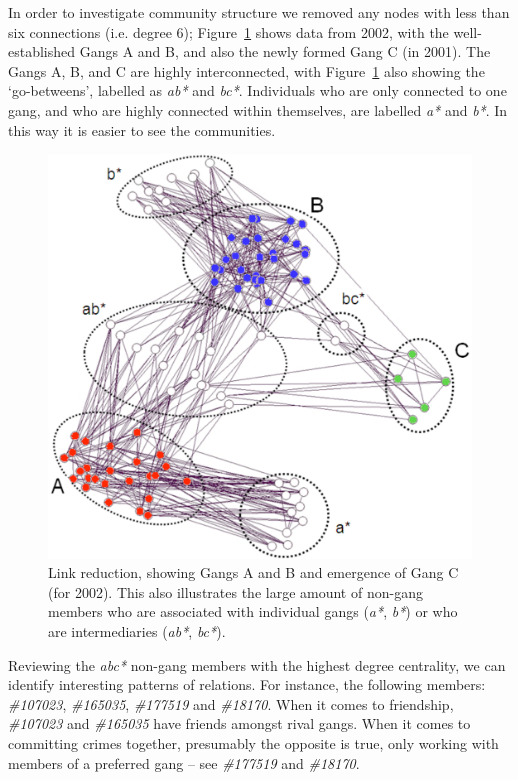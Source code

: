 \documentclass[twocolumn]{svjour3}          %
\theoremstyle{definition}
\begin{document}
In order to investigate community structure we removed any nodes with
less than six connections (i.e. degree 6);
Figure~\ref{fig:2002core_labelled} shows data from 2002, with the
well-established Gangs A and B, and also the newly formed Gang C (in
2001). The Gangs A, B, and C are highly interconnected, with
Figure~\ref{fig:2002core_labelled} also showing the `go-betweens',
labelled as \emph{ab*} and \emph{bc*}. Individuals who are only
connected to one gang, and who are highly connected within themselves,
are labelled \emph{a*} and \emph{b*}. In this way it is easier to see
the communities. 

\begin{figure}[!ht]
\centering
\includegraphics[width=\columnwidth]{images/2002core_labelled}
\caption{Link reduction, showing Gangs A and B and emergence of
  Gang C (for 2002). This also illustrates the large amount of non-gang
  members who are associated with individual gangs (\emph{a*}, \emph{b*}) or who are intermediaries (\emph{ab*}, \emph{bc*}).}
\label{fig:2002core_labelled}
\end{figure}

Reviewing the {\emph{abc*}} non-gang members with the
highest degree centrality, we can identify interesting patterns of
relations. For instance, the following members: {\emph{\#107023}},
{\emph{\#165035}}, {\emph{\#177519}} and {\emph{\#18170}}. When it
comes to friendship, {\emph{\#107023}} and {\emph{\#165035}} have
friends amongst rival gangs. When it comes to committing crimes
together, presumably the opposite is true, only working with members
of a preferred gang -- see {\emph{\#177519}} and {\emph{\#18170}}.
\end{document}
